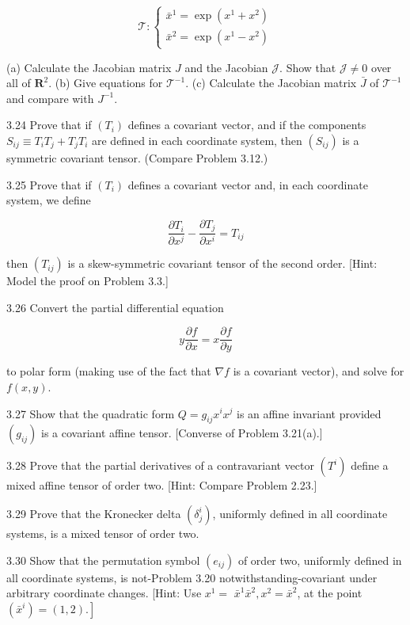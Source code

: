 \documentclass[10pt]{article}
\begin{document}
$$
\mathscr{T}:\left\{\begin{array}{l}
\bar{x}^{1}=\exp \left(x^{1}+x^{2}\right) \\
\bar{x}^{2}=\exp \left(x^{1}-x^{2}\right)
\end{array}\right.
$$

(a) Calculate the Jacobian matrix $J$ and the Jacobian $\mathscr{J}$. Show that $\mathscr{J} \neq 0$ over all of $\mathbf{R}^{2}$. (b) Give equations for $\mathscr{T}^{-1}$. (c) Calculate the Jacobian matrix $\bar{J}$ of $\mathscr{T}^{-1}$ and compare with $J^{-1}$.

3.24 Prove that if $\left(T_{i}\right)$ defines a covariant vector, and if the components $S_{i j} \equiv T_{i} T_{j}+T_{j} T_{i}$ are defined in each coordinate system, then $\left(S_{i j}\right)$ is a symmetric covariant tensor. (Compare Problem 3.12.)

3.25 Prove that if $\left(T_{i}\right)$ defines a covariant vector and, in each coordinate system, we define

$$
\frac{\partial T_{i}}{\partial x^{j}}-\frac{\partial T_{j}}{\partial x^{i}}=T_{i j}
$$

then $\left(T_{i j}\right)$ is a skew-symmetric covariant tensor of the second order. [Hint: Model the proof on Problem 3.3.]

3.26 Convert the partial differential equation

$$
y \frac{\partial f}{\partial x}=x \frac{\partial f}{\partial y}
$$

to polar form (making use of the fact that $\nabla f$ is a covariant vector), and solve for $f(x, y)$.

3.27 Show that the quadratic form $Q=g_{i j} x^{i} x^{j}$ is an affine invariant provided $\left(g_{i j}\right)$ is a covariant affine tensor. [Converse of Problem 3.21(a).]

3.28 Prove that the partial derivatives of a contravariant vector $\left(T^{i}\right)$ define a mixed affine tensor of order two. [Hint: Compare Problem 2.23.]

3.29 Prove that the Kronecker delta $\left(\delta_{j}^{i}\right)$, uniformly defined in all coordinate systems, is a mixed tensor of order two.

3.30 Show that the permutation symbol $\left(e_{i j}\right)$ of order two, uniformly defined in all coordinate systems, is not-Problem 3.20 notwithstanding-covariant under arbitrary coordinate changes. [Hint: Use $x^{1}=$ $\bar{x}^{1} \bar{x}^{2}, x^{2}=\bar{x}^{2}$, at the point $\left.\left(\bar{x}^{i}\right)=(1,2).\right]$
\end{document}
